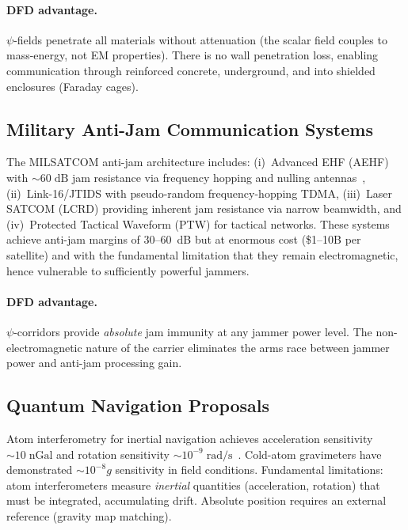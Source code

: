 \documentclass[twocolumn,superscriptaddress,prd,nofootinbib]{revtex4-2}
\begin{document}
\paragraph{DFD advantage.}
$\psi$-fields penetrate all materials without attenuation
(the scalar field couples to mass-energy, not EM properties). There is
no wall penetration loss, enabling communication through reinforced
concrete, underground, and into shielded enclosures (Faraday cages).

\subsection{Military Anti-Jam Communication Systems}

The MILSATCOM anti-jam architecture includes:
(i)~Advanced EHF (AEHF) with $\sim 60\;\text{dB}$ jam resistance via
frequency hopping and nulling antennas~\cite{Warner2019AEHF},
(ii)~Link-16/JTIDS with pseudo-random frequency-hopping TDMA,
(iii)~Laser SATCOM (LCRD) providing inherent jam resistance via narrow
beamwidth, and
(iv)~Protected Tactical Waveform (PTW) for tactical
networks. These systems achieve anti-jam margins of 30--60~dB but at
enormous cost (\$1--10B per satellite) and with the fundamental
limitation that they remain electromagnetic, hence vulnerable to
sufficiently powerful jammers.

\paragraph{DFD advantage.}
$\psi$-corridors provide \emph{absolute} jam immunity at any jammer
power level. The non-electromagnetic nature of the carrier eliminates
the arms race between jammer power and anti-jam processing gain.

\subsection{Quantum Navigation Proposals}

Atom interferometry for inertial navigation achieves acceleration
sensitivity $\sim 10\;\text{nGal}$ and rotation sensitivity
$\sim 10^{-9}\;\text{rad/s}$~\cite{Geiger2020AtomInterferometry,
Narducci2022QuantumNav}. Cold-atom gravimeters have demonstrated
$\sim 10^{-8}g$ sensitivity in field conditions. Fundamental
limitations: atom interferometers measure \emph{inertial} quantities
(acceleration, rotation) that must be integrated, accumulating drift.
Absolute position requires an external reference (gravity map matching).
\end{document}
